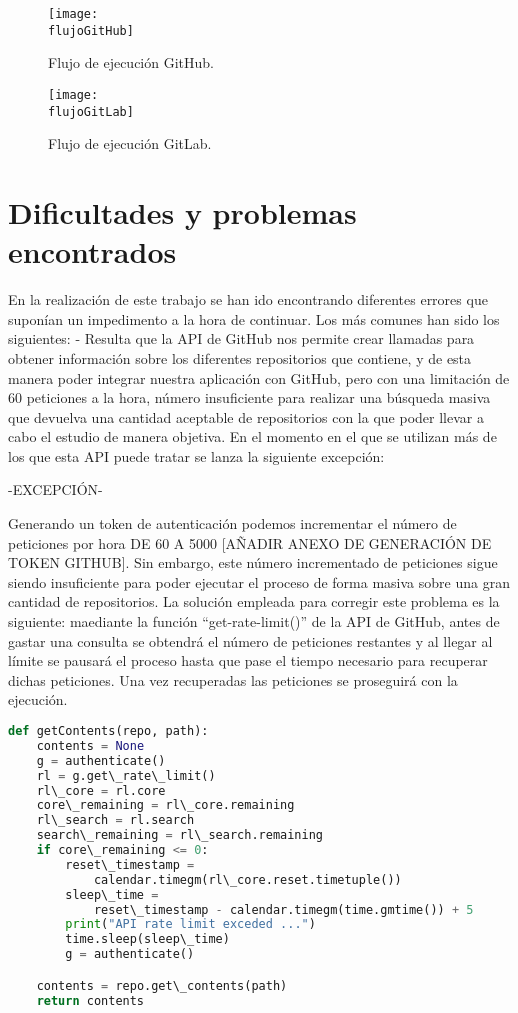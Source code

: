 \begin{figure}[h]
    \centering
    \texttt{[image: \\flujoGitHub]}
    \caption{Flujo de ejecución GitHub.}
\end{figure}

\begin{figure}[h]
    \centering
    \texttt{[image: \\flujoGitLab]}
    \caption{Flujo de ejecución GitLab.}
\end{figure}

\section{Dificultades y problemas encontrados}
En la realización de este trabajo se han ido encontrando diferentes errores que suponían un impedimento a la hora de continuar. Los más comunes han sido los siguientes:
- Resulta que la API de GitHub nos permite crear llamadas para obtener información sobre los diferentes repositorios que contiene, y de esta manera poder integrar nuestra aplicación con GitHub, pero con una limitación de 60 peticiones a la hora, número insuficiente para realizar una búsqueda masiva que devuelva una cantidad aceptable de repositorios con la que poder llevar a cabo el estudio de manera objetiva. En el momento en el que se utilizan más de los que esta API puede tratar se lanza la siguiente excepción: 

-EXCEPCIÓN-

Generando un token de autenticación podemos incrementar el número de peticiones por hora DE 60 A 5000 [AÑADIR ANEXO DE GENERACIÓN DE TOKEN GITHUB]. Sin embargo, este número incrementado de peticiones sigue siendo insuficiente para poder ejecutar el proceso de forma masiva sobre una gran cantidad de repositorios.
La solución empleada para corregir este problema es la siguiente: maediante la función ``get-rate-limit()'' de la API de GitHub, antes de gastar una consulta se obtendrá el número de peticiones restantes y al llegar al límite se pausará el proceso hasta que pase el tiempo necesario para recuperar dichas peticiones. Una vez recuperadas las peticiones se proseguirá con la ejecución.

\begin{lstlisting}[language=Python, caption=Python example, label={lst:ejem1}]
def getContents(repo, path):
    contents = None
    g = authenticate()
    rl = g.get\_rate\_limit()
    rl\_core = rl.core
    core\_remaining = rl\_core.remaining
    rl\_search = rl.search
    search\_remaining = rl\_search.remaining
    if core\_remaining <= 0:
        reset\_timestamp = 
            calendar.timegm(rl\_core.reset.timetuple())
        sleep\_time = 
            reset\_timestamp - calendar.timegm(time.gmtime()) + 5
        print("API rate limit exceded ...")
        time.sleep(sleep\_time)
        g = authenticate()

    contents = repo.get\_contents(path)
    return contents
\end{lstlisting}

